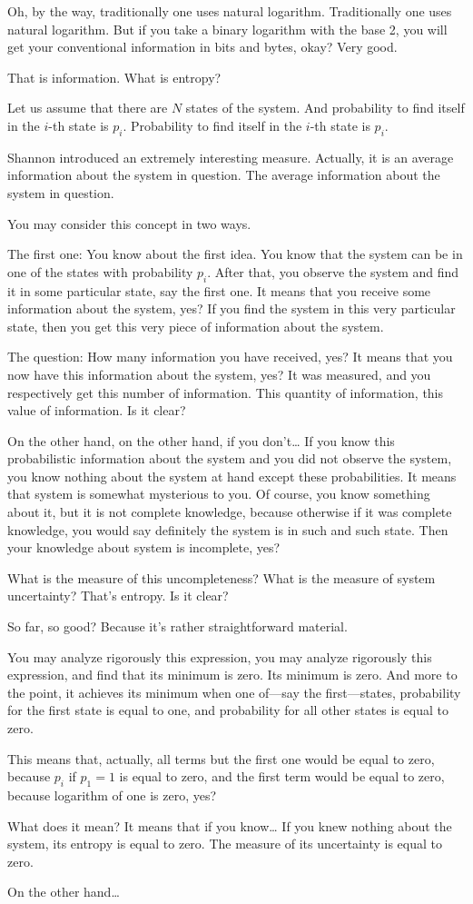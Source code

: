 \documentclass{article}
\begin{document}
Oh, by the way, traditionally one uses natural logarithm. Traditionally one uses natural logarithm. But if you take a binary logarithm with the base 2, you will get your conventional information in bits and bytes, okay? Very good.

That is information. What is entropy?

Let us assume that there are $N$ states of the system. And probability to find itself in the $i$-th state is $p_i$. Probability to find itself in the $i$-th state is $p_i$.

Shannon introduced an extremely interesting measure. Actually, it is an average information about the system in question. The average information about the system in question.

You may consider this concept in two ways.

The first one: You know about the first idea. You know that the system can be in one of the states with probability $p_i$. After that, you observe the system and find it in some particular state, say the first one. It means that you receive some information about the system, yes? If you find the system in this very particular state, then you get this very piece of information about the system.

The question: How many information you have received, yes? It means that you now have this information about the system, yes? It was measured, and you respectively get this number of information. This quantity of information, this value of information. Is it clear?

On the other hand, on the other hand, if you don’t… If you know this probabilistic information about the system and you did not observe the system, you know nothing about the system at hand except these probabilities. It means that system is somewhat mysterious to you. Of course, you know something about it, but it is not complete knowledge, because otherwise if it was complete knowledge, you would say definitely the system is in such and such state. Then your knowledge about system is incomplete, yes?

What is the measure of this uncompleteness? What is the measure of system uncertainty? That’s entropy. Is it clear?

So far, so good? Because it’s rather straightforward material.

You may analyze rigorously this expression, you may analyze rigorously this expression, and find that its minimum is zero. Its minimum is zero. And more to the point, it achieves its minimum when one of—say the first—states, probability for the first state is equal to one, and probability for all other states is equal to zero.

This means that, actually, all terms but the first one would be equal to zero, because $p_i$ if $p_1 = 1$ is equal to zero, and the first term would be equal to zero, because logarithm of one is zero, yes?

What does it mean? It means that if you know… If you knew nothing about the system, its entropy is equal to zero. The measure of its uncertainty is equal to zero.

On the other hand…
\end{document}
